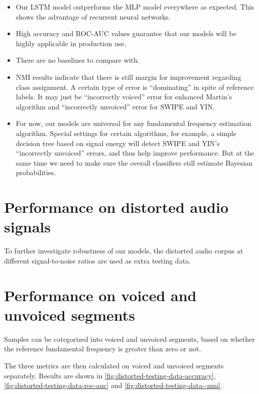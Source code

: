 \documentclass[11pt,a4paper]{report}
\begin{document}
\begin{itemize}
  \item Our LSTM model outperforms the MLP model everywhere as expected.
    This shows the advantage of recurrent neural networks.
  \item High accuracy and ROC-AUC values guarantee that our models will be highly applicable in production use.
  \item There are no baselines to compare with.

  \bigskip

  \item NMI results indicate that there is still margin for improvement regarding class assignment.
    A certain type of error is \enquote{dominating} in spite of reference labels.
    It may just be \enquote{incorrectly voiced} error for enhanced Martin's algorithm and \enquote{incorrectly unvoiced} error for SWIPE and YIN.
  \item For now, our models are universal for any fundamental frequency estimation algorithm.
    Special settings for certain algorithms, for example, a simple decision tree based on signal energy will detect SWIPE and YIN's \enquote{incorrectly unvoiced} errors, and thus help improve performance.
    But at the same time we need to make sure the overall classifiers still estimate Bayesian probabilities.
\end{itemize}

\newpage

\section{Performance on distorted audio signals}

To further investigate robustness of our models, the distorted audio corpus at different signal-to-noise ratios are used as extra testing data.

\section{Performance on voiced and unvoiced segments}

Samples can be categorized into voiced and unvoiced segments, based on whether the reference fundamental frequency is greater than zero or not.

The three metrics are then calculated on voiced and unvoiced segments separately. Results are shown in \autoref{fig:distorted-testing-data-accuracy}, \autoref{fig:distorted-testing-data-roc-auc} and \autoref{fig:distorted-testing-data--nmi}.
\end{document}

